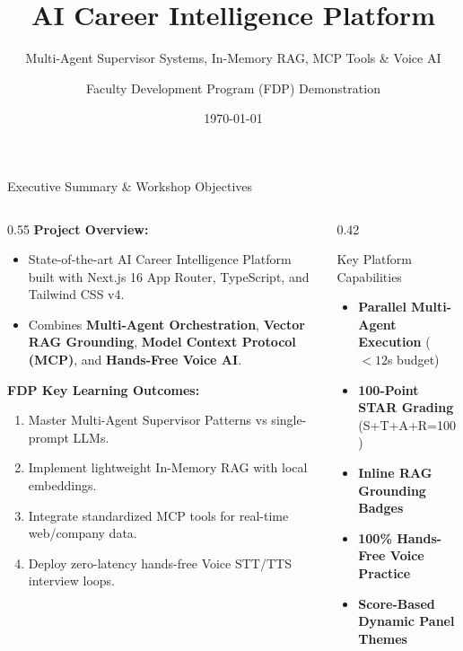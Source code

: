 \documentclass[aspectratio=169, 10pt]{beamer}
\title[AI Career Intel Platform]{AI Career Intelligence Platform}
\subtitle{Multi-Agent Supervisor Systems, In-Memory RAG, MCP Tools \& Voice AI}
\author[Faculty Development Program]{Faculty Development Program (FDP) Demonstration}
\institute[Computer Science \& AI]{Department of Computer Science \& Artificial Intelligence}
\date{\today}
\begin{document}
\begin{frame}
  \titlepage
\end{frame}

\begin{frame}{Executive Summary \& Workshop Objectives}
  \begin{columns}
    \begin{column}{0.55\textwidth}
      \textbf{Project Overview:}
      \begin{itemize}
        \item State-of-the-art \alert{AI Career Intelligence Platform} built with Next.js 16 App Router, TypeScript, and Tailwind CSS v4.
        \item Combines \textbf{Multi-Agent Orchestration}, \textbf{Vector RAG Grounding}, \textbf{Model Context Protocol (MCP)}, and \textbf{Hands-Free Voice AI}.
      \end{itemize}
      
      \vspace{0.3cm}
      \textbf{FDP Key Learning Outcomes:}
      \begin{enumerate}
        \item Master Multi-Agent Supervisor Patterns vs single-prompt LLMs.
        \item Implement lightweight In-Memory RAG with local embeddings.
        \item Integrate standardized MCP tools for real-time web/company data.
        \item Deploy zero-latency hands-free Voice STT/TTS interview loops.
      \end{enumerate}
    \end{column}

    \begin{column}{0.42\textwidth}
      \begin{block}{Key Platform Capabilities}
        \small
        \begin{itemize}
          \item \textbf{Parallel Multi-Agent Execution} ($<12$s budget)
          \item \textbf{100-Point STAR Grading} (S+T+A+R=100)
          \item \textbf{Inline RAG Grounding Badges}
          \item \textbf{100\% Hands-Free Voice Practice}
          \item \textbf{Score-Based Dynamic Panel Themes}
        \end{itemize}
      \end{block}
    \end{column}
  \end{columns}
\end{frame}
\end{document}

